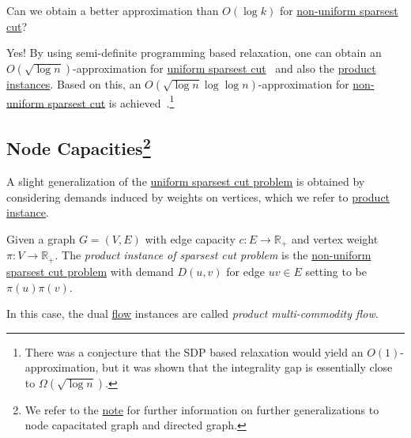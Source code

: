\begin{problem*}\label{prb:SDP-sparsest-cut}
	Can we obtain a better approximation than \(O(\log k)\) for \hyperref[prb:non-uniform-sparsest-cut]{non-uniform sparsest cut}?
\end{problem*}
\begin{answer}
	Yes! By using semi-definite programming based relaxation, one can obtain an \(O(\sqrt{\log n} )\)-approximation for \hyperref[prb:sparsest-cut]{uniform sparsest cut}~\cite{arora2009expander} and also the \hyperref[prb:product-instance-of-sparsest-cut]{product instances}. Based on this, an \(O(\sqrt{\log n} \log \log n )\)-approximation for \hyperref[prb:non-uniform-sparsest-cut]{non-uniform sparsest cut} is achieved~\cite{arora2005euclidean,arora2007frechet}.\footnote{There was a conjecture that the SDP based relaxation would yield an \(O(1)\)-approximation, but it was shown that the integrality gap is essentially close to \(\Omega (\sqrt{\log n} )\).}
\end{answer}

\subsection{Node Capacities\footnote{We refer to the \href{https://courses.grainger.illinois.edu/cs598csc/fa2024/Notes/lec-sparsest-cut.pdf}{note} for further information on further generalizations to node capacitated graph and directed graph.}}
A slight generalization of the \hyperref[prb:sparsest-cut]{uniform sparsest cut problem} is obtained by considering demands induced by weights on vertices, which we refer to \hyperref[prb:product-instance-of-sparsest-cut]{product instance}.

\begin{problem}\label{prb:product-instance-of-sparsest-cut}
Given a graph \(G = (V, E)\) with edge capacity \(c \colon E \to \mathbb{R} _{+}\) and vertex weight \(\pi \colon V \to \mathbb{R} _{+}\). The \emph{product instance of sparsest cut problem} is the \hyperref[prb:non-uniform-sparsest-cut]{non-uniform sparsest cut problem} with demand \(D(u, v)\) for edge \(uv \in E\) setting to be \(\pi (u) \pi (v)\).
\end{problem}

\begin{notation}
	In this case, the dual \hyperref[def:flow]{flow} instances are called \emph{product multi-commodity flow}.
\end{notation}


